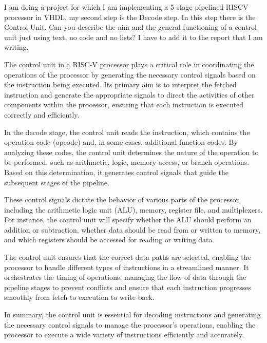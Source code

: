 \documentclass{article}
\begin{document}
\begin{itshape}
I am doing a project for which I am implementing a 5 stage pipelined RISCV processor in VHDL, 
my second step is the Decode step. In this step there is the Control Unit. Can you describe the aim and
the general functioning of a control unit just using text, no code and no lists? I have to add it to
the report that I am writing.
\end{itshape}

\begin{spverbatim}
The control unit in a RISC-V processor plays a 
critical role in coordinating the operations 
of the processor by generating the necessary 
control signals based on the instruction being executed. 
Its primary aim is to interpret the fetched 
instruction and generate the appropriate signals 
to direct the activities of other components within the processor, 
ensuring that each instruction is executed correctly and efficiently.

In the decode stage, the control unit 
reads the instruction, which contains the operation 
code (opcode) and, in some cases, additional function codes. 
By analyzing these codes, the control unit determines the nature 
of the operation to be performed, such as arithmetic, 
logic, memory access, or branch operations. 
Based on this determination, it generates control signals 
that guide the subsequent stages of the pipeline.

These control signals dictate the behavior of various parts of the processor, 
including the arithmetic logic unit (ALU), memory, register file, and multiplexers. 
For instance, the control unit will specify 
whether the ALU should perform an addition or subtraction, 
whether data should be read from or written to memory, 
and which registers should be accessed for reading or writing data.

The control unit ensures that the correct data paths are selected, 
enabling the processor to handle different 
types of instructions in a streamlined manner. 
It orchestrates the timing of operations, managing the flow 
of data through the pipeline stages to prevent conflicts and 
ensure that each instruction progresses 
smoothly from fetch to execution to write-back.

In summary, the control unit is essential for decoding instructions 
and generating the necessary control signals to manage the processor's operations, 
enabling the processor to execute a wide variety 
of instructions efficiently and accurately.
\end{spverbatim}

\clearpage
\printglossary
\clearpage



\nocite{*}


\end{document}

